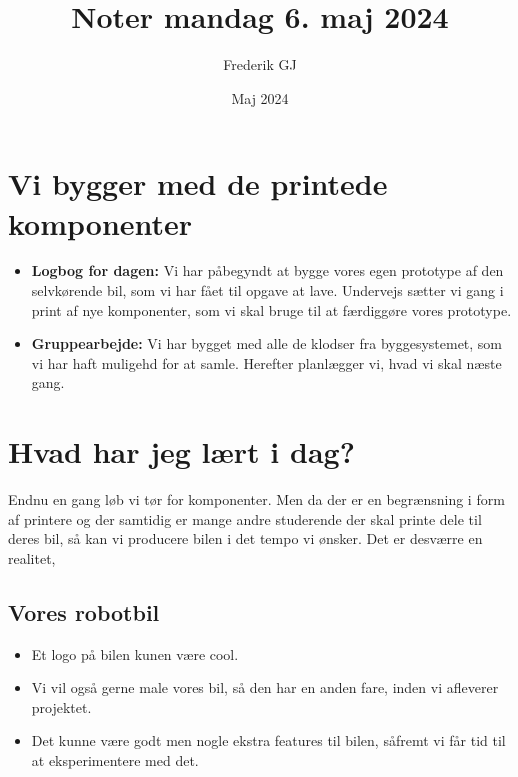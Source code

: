 \documentclass{article}
\title{Noter mandag 6. maj 2024}
\author{Frederik GJ}
\date{Maj 2024}
\begin{document}
\maketitle

\section{Vi bygger med de printede komponenter}

\begin{itemize}
    \item \textbf{Logbog for dagen:} Vi har påbegyndt at bygge vores egen prototype af den selvkørende bil, som vi har fået til opgave at lave. Undervejs sætter vi gang i print af nye komponenter, som vi skal bruge til at færdiggøre vores prototype.
    \item \textbf{Gruppearbejde:} Vi har bygget med alle de klodser fra byggesystemet, som vi har haft muligehd for at samle. Herefter planlægger vi, hvad vi skal næste gang. 
    
\end{itemize}

\section{Hvad har jeg lært i dag?}
Endnu en gang løb vi tør for komponenter. Men da der er en begrænsning i form af printere og der samtidig er mange andre studerende der skal printe dele til deres bil, så kan vi producere bilen i det tempo vi ønsker. Det er desværre en realitet,

\subsection{Vores robotbil}
\begin{itemize}
    \item Et logo på bilen kunen være cool. 
    \item Vi vil også gerne male vores bil, så den har en anden fare, inden vi afleverer projektet. 
    \item Det kunne være godt men nogle ekstra features til bilen, såfremt vi får tid til at eksperimentere med det. 
    
\end{itemize}
\end{document}
